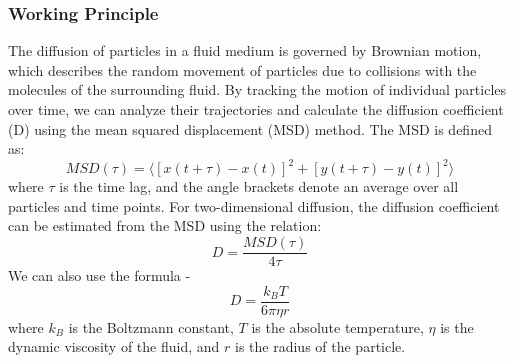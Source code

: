 \documentclass[openany]{book}
\begin{document}
\subsubsection{Working Principle}
The diffusion of particles in a fluid medium is governed by Brownian motion, which describes the random movement of particles due to collisions with the molecules of the surrounding fluid. By tracking the motion of individual particles over time, we can analyze their trajectories and calculate the diffusion coefficient (D) using the mean squared displacement (MSD) method. The MSD is defined as:
$$\boxed{MSD(\tau) = \langle [x(t + \tau) - x(t)]^2 + [y(t + \tau) - y(t)]^2 \rangle}$$
where $\tau$ is the time lag, and the angle brackets denote an average over all particles and time points. For two-dimensional diffusion, the diffusion coefficient can be estimated from the MSD using the relation:
$$\boxed{D = \frac{MSD(\tau)}{4\tau}}$$
We can also use the formula - 
$$\boxed{D = \frac{k_B T}{6 \pi \eta r}}$$
where $k_B$ is the Boltzmann constant, $T$ is the absolute temperature, $\eta$ is the dynamic viscosity of the fluid, and $r$ is the radius of the particle.
\end{document}
